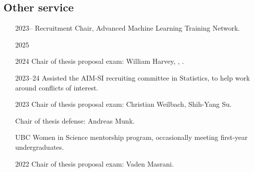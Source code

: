 \documentclass[10pt]{article}
\begin{document}
\subsection{Other service} %

\begin{itemize}[leftmargin=5em]
  \item[2023--] {Recruitment Chair, Advanced Machine Learning Training Network.}
  \item[2025] 
  \item[2024] Chair of thesis proposal exam: William Harvey, , .
  \item[2023--24] {Assisted the AIM-SI recruiting committee in Statistics, to help work around conflicts of interest.}
  \item[2023] Chair of thesis proposal exam: Christian Weilbach, Shih-Yang Su.
  \item[] Chair of thesis defense: Andreas Munk.
  \item[] UBC Women in Science mentorship program, occasionally meeting first-year undergraduates.
  \item[2022] Chair of thesis proposal exam: Vaden Masrani.
\end{itemize}





\end{document}
